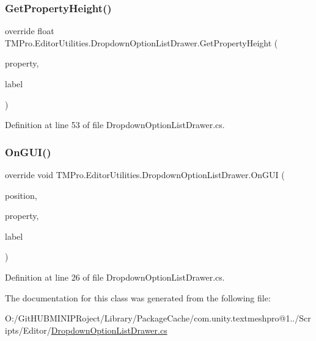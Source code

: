 \subsubsection{\texorpdfstring{GetPropertyHeight()}{GetPropertyHeight()}}
{\footnotesize\ttfamily override float T\+M\+Pro.\+Editor\+Utilities.\+Dropdown\+Option\+List\+Drawer.\+Get\+Property\+Height (\begin{DoxyParamCaption}\item[{Serialized\+Property}]{property,  }\item[{G\+U\+I\+Content}]{label }\end{DoxyParamCaption})}



Definition at line 53 of file Dropdown\+Option\+List\+Drawer.\+cs.

\mbox{\label{class_t_m_pro_1_1_editor_utilities_1_1_dropdown_option_list_drawer_afc5bab371068b5b588155ab522b8e040}} 
\subsubsection{\texorpdfstring{OnGUI()}{OnGUI()}}
{\footnotesize\ttfamily override void T\+M\+Pro.\+Editor\+Utilities.\+Dropdown\+Option\+List\+Drawer.\+On\+G\+UI (\begin{DoxyParamCaption}\item[{Rect}]{position,  }\item[{Serialized\+Property}]{property,  }\item[{G\+U\+I\+Content}]{label }\end{DoxyParamCaption})}



Definition at line 26 of file Dropdown\+Option\+List\+Drawer.\+cs.



The documentation for this class was generated from the following file\+:\begin{DoxyCompactItemize}
\item 
O\+:/\+Git\+H\+U\+B\+M\+I\+N\+I\+P\+Roject/\+Library/\+Package\+Cache/com.\+unity.\+textmeshpro@1../\+Scripts/\+Editor/\mbox{\hyperlink{_dropdown_option_list_drawer_8cs}{Dropdown\+Option\+List\+Drawer.\+cs}}\end{DoxyCompactItemize}
